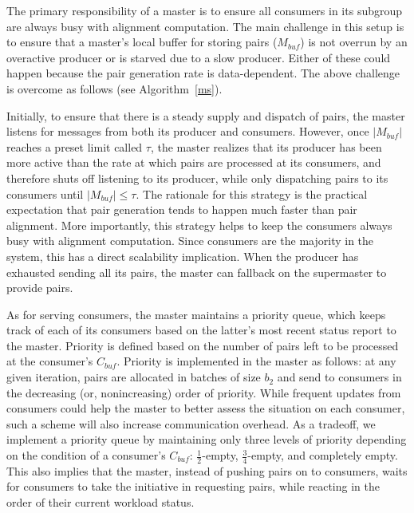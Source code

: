 \documentclass[10pt,journal,letterpaper,compsoc]{IEEEtran}
\begin{document}
The primary responsibility of a master is to ensure all consumers in its subgroup are always busy with alignment computation. The main challenge in this setup is to ensure that a master's local buffer for storing pairs ($M_{buf}$) is not overrun by an overactive producer or is starved due to a slow producer. Either of these could happen because the pair generation rate is data-dependent. The above challenge is overcome as follows (see Algorithm~\ref{ms}).  

Initially, to ensure that there is a steady supply and dispatch of pairs, the master listens for messages from both its producer and consumers. However, once $|M_{buf}|$ reaches a preset limit called $\tau$, the master realizes that its producer has been more active than the rate at which pairs are processed at its consumers, and therefore shuts off listening to its producer, while only dispatching pairs to its consumers until $|M_{buf}|\leq\tau$. The rationale for this strategy is the practical expectation that pair generation tends to happen much faster than pair alignment. More importantly, this strategy helps to keep the consumers always busy with alignment computation. Since consumers are the majority in the system, this has a direct scalability implication. When the  producer has exhausted sending all its pairs, the master can fallback on the supermaster to provide pairs. 

As for serving consumers, the master maintains a priority queue, which keeps track of each of its consumers based on the latter's most recent status report to the master. Priority is defined based on the number of pairs left to be processed at the consumer's $C_{buf}$. Priority is implemented in the master as follows: at any given iteration, pairs are allocated in batches of size $b_2$ and send to consumers in the decreasing (or, nonincreasing) order of priority. While frequent updates from consumers could help the master to better assess the situation on each consumer, such a scheme will also increase communication overhead. As a tradeoff, we implement a priority queue by maintaining only three levels of priority depending on the condition of a consumer's $C_{buf}$: $\frac{1}{2}$-empty, $\frac{3}{4}$-empty, and completely empty. This also implies that the master, instead of pushing pairs on to consumers, waits for consumers to take the initiative in requesting pairs, while reacting in the order of their current workload status. \\
\end{document}
